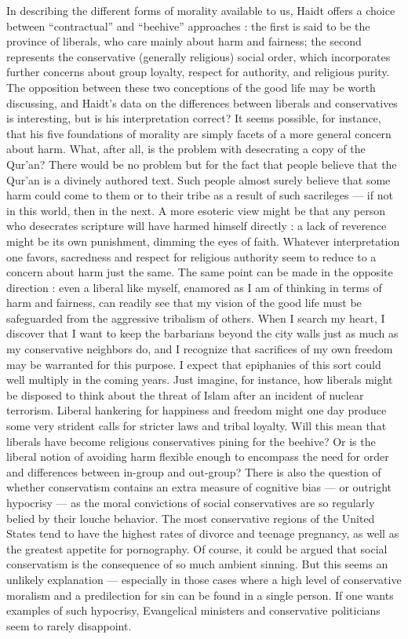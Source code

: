 \documentclass[a4paper,14pt]{extbook}
\begin{document}
In describing the different forms of morality available to us, Haidt offers a choice between ``contractual'' and ``beehive'' approaches :
the first is said to be the province of liberals, who care mainly about harm and fairness;
the second represents the conservative (generally religious) social order, which incorporates further concerns about group loyalty, respect for authority, and religious purity.
The opposition between these two conceptions of the good life may be worth discussing, and Haidt's data on the differences between liberals and conservatives is interesting, but is his interpretation correct?
It seems possible, for instance, that his five foundations of morality are simply facets of a more general concern about harm.
What, after all, is the problem with desecrating a copy of the Qur'an?
There would be no problem but for the fact that people believe that the Qur'an is a divinely authored text.
Such people almost surely believe that some harm could come to them or to their tribe as a result of such sacrileges --- if not in this world, then in the next.
A more esoteric view might be that any person who desecrates scripture will have harmed himself directly :
a lack of reverence might be its own punishment, dimming the eyes of faith.
Whatever interpretation one favors, sacredness and respect for religious authority seem to reduce to a concern about harm just the same.
The same point can be made in the opposite direction :
even a liberal like myself, enamored as I am of thinking in terms of harm and fairness, can readily see that my vision of the good life must be safeguarded from the aggressive tribalism of others.
When I search my heart, I discover that I want to keep the barbarians beyond the city walls just as much as my conservative neighbors do, and I recognize that sacrifices of my own freedom may be warranted for this purpose.
I expect that epiphanies of this sort could well multiply in the coming years.
Just imagine, for instance, how liberals might be disposed to think about the threat of Islam after an incident of nuclear terrorism.
Liberal hankering for happiness and freedom might one day produce some very strident calls for stricter laws and tribal loyalty.
Will this mean that liberals have become religious conservatives pining for the beehive?
Or is the liberal notion of avoiding harm flexible enough to encompass the need for order and differences between in-group and out-group?
There is also the question of whether conservatism contains an extra measure of cognitive bias --- or outright hypocrisy --- as the moral convictions of social conservatives are so regularly belied by their louche behavior.
The most conservative regions of the United States tend to have the highest rates of divorce and teenage pregnancy, as well as the greatest appetite for pornography.
Of course, it could be argued that social conservatism is the consequence of so much ambient sinning.
But this seems an unlikely explanation --- especially in those cases where a high level of conservative moralism and a predilection for sin can be found in a single person.
If one wants examples of such hypocrisy, Evangelical ministers and conservative politicians seem to rarely disappoint.
\end{document}
